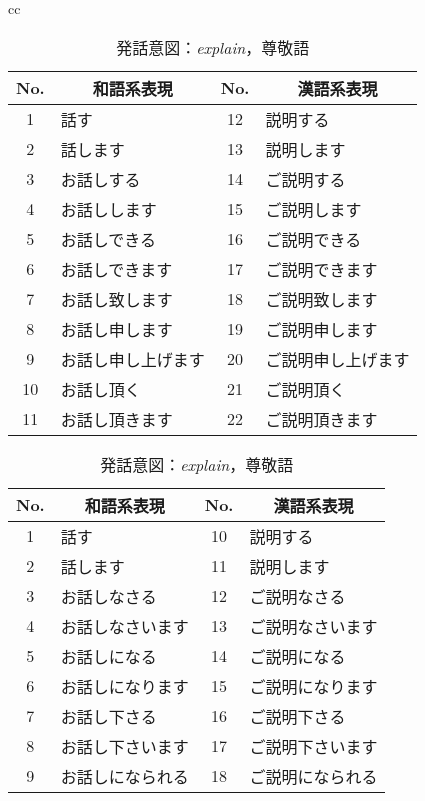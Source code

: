 \begin{table}[htbp]
\begin{center}
{ \scriptsize
\begin{tabular}{cc}
\begin{minipage}[t]{0.5\hsize}
\begin{center}



\caption{発話意図：{\it explain}，謙譲語} 
\label{tbl2:table2.1} 
\begin{tabular}{|c||l|c||l|} 
\hline 
No. & \multicolumn{1}{|c|}{和語系表現} & No. & \multicolumn{1}{|c|}{漢語系表現} \\
\hline 
1&	話す&			12&	説明する \\
\hline 
2&	話します&		13&	説明します \\
\hline 
3&	お話しする&		14&	ご説明する \\
\hline 
4&	お話しします&		15&	ご説明します \\
\hline 
5&	お話しできる&		16&	ご説明できる \\
\hline 
6&	お話しできます&		17&	ご説明できます \\
\hline 
7&	お話し致します&		18&	ご説明致します \\
\hline 
8&	お話し申します&		19&	ご説明申します \\
\hline 
9&	お話し申し上げます&	20&	ご説明申し上げます \\
\hline 
10&	お話し頂く&		21&	ご説明頂く \\
\hline 
11&	お話し頂きます&		22&	ご説明頂きます \\
\hline 
\end{tabular} 

\end{center}
\end{minipage}
\begin{minipage}[t]{0.5\hsize}
\begin{center}



\caption{発話意図：{\it explain}，尊敬語} 
\label{tbl2:table2.2} 
\begin{tabular}{|c||l|c||l|} 
\hline 
No. & \multicolumn{1}{|c|}{和語系表現} & No. & \multicolumn{1}{|c|}{漢語系表現} \\
\hline 
1&	話す&			10&	説明する \\
\hline 
2&	話します&		11&	説明します\\
\hline 
3&	お話しなさる&		12&	ご説明なさる\\
\hline 
4&	お話しなさいます&	13&	ご説明なさいます\\
\hline 
5&	お話しになる&		14&	ご説明になる\\
\hline 
6&	お話しになります&	15&	ご説明になります\\
\hline 
7&	お話し下さる&		16&	ご説明下さる\\
\hline 
8&	お話し下さいます&	17&	ご説明下さいます\\
\hline 
9&	お話しになられる&	18&	ご説明になられる\\
\hline 
\end{tabular} 


\end{center}
\end{minipage}
\end{tabular}}
\end{center}
\end{table}

